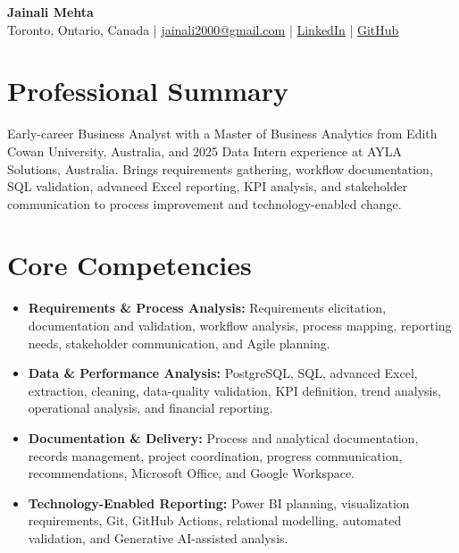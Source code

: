 \documentclass[letterpaper,10pt]{article}
\begin{document}
\begin{center}
  {\fontsize{17}{19}\selectfont\textbf{Jainali Mehta}}\\[2pt]
  \small Toronto, Ontario, Canada \;|\;
  \href{mailto:jainali2000@gmail.com}{jainali2000@gmail.com} \;|\;
  \href{https://www.linkedin.com/in/jainali-mehta}{LinkedIn} \;|\;
  \href{https://github.com/jainalimehta}{GitHub}
\end{center}
\vspace{-7pt}

\section{Professional Summary}
\small Early-career Business Analyst with a Master of Business Analytics from Edith Cowan University, Australia, and 2025 Data Intern experience at AYLA Solutions, Australia. Brings requirements gathering, workflow documentation, SQL validation, advanced Excel reporting, KPI analysis, and stakeholder communication to process improvement and technology-enabled change.

\section{Core Competencies}
\begin{itemize}[leftmargin=0.16in,label=\textbullet,topsep=0pt,itemsep=1pt,parsep=0pt]
  \item \small \textbf{Requirements \& Process Analysis:} Requirements elicitation, documentation and validation, workflow analysis, process mapping, reporting needs, stakeholder communication, and Agile planning.
  \item \small \textbf{Data \& Performance Analysis:} PostgreSQL, SQL, advanced Excel, extraction, cleaning, data-quality validation, KPI definition, trend analysis, operational analysis, and financial reporting.
  \item \small \textbf{Documentation \& Delivery:} Process and analytical documentation, records management, project coordination, progress communication, recommendations, Microsoft Office, and Google Workspace.
  \item \small \textbf{Technology-Enabled Reporting:} Power BI planning, visualization requirements, Git, GitHub Actions, relational modelling, automated validation, and Generative AI-assisted analysis.
\end{itemize}
\end{document}
